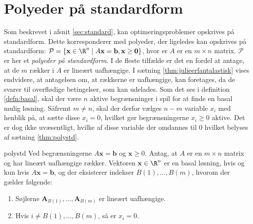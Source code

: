 \section{Polyeder på standardform}
\label{afsnit:fisk}
%
Som beskrevet i afsnit \ref{sec:standard}, kan optimeringsproblemer opskrives på standardform.
Dette korresponderer med polyeder, der ligeledes kan opskrives på standardform: 
$\mathcal{P}=\{ \mathbf{x} \in \R^n  \mid  A\mathbf{x}=\mathbf{b}, \mathbf{x} \geq \mathbf{0} \}$, hvor er $A$ er en $m \times n$ matrix.
$\mathcal{P}$ er her et \textit{polyeder på standardform}.
I de fleste tilfælde er det en fordel at antage, at de $m$ rækker i $A$ er lineært uafhængige.
I sætning \ref{thm:julieerfantalastisk} vises endvidere, at antagelsen om, at rækkerne er uafhængige, kan foretages, da de svarer til overflødige betingelser, som kan udelades.
Som det ses i definition \ref{defn:basal}, skal der være $n$ aktive begrænsninger i spil for at finde en basal mulig løsning.
Såfremt $m \neq n$, skal der derfor vælges $n-m$ variable $x_i$ med henblik på, at sætte disse $x_i=0$, hvilket gør begrænsningerne $x_i \geq 0$ aktive.
Det er dog ikke uvæsentligt, hvilke af disse variable der omdannes til $0$ hvilket belyses af sætning \ref{thm:polystd}.
%
\begin{thm}{}{polystd}
Ved begrænsningerne $A\mathbf{x}=\mathbf{b}$ og $\mathbf{x}\geq 0$.
Antag, at $A$ er en $m \times n$ matrix og har lineært uafhængige rækker.
Vektoren $\mathbf{x} \in \R^n$ er en basal løsning, hvis og kun hvis $A\mathbf{x}=\mathbf{b}$, og der eksisterer indekser $B(1),\ldots,B(m)$, hvorom der gælder følgende:
\begin{enumerate}[label=(\alph*)]
\item Søjlerne $\mathbf{A}_{B(1)},\ldots,\mathbf{A}_{B(m)}$ er lineært uafhængige.
\item Hvis $i \neq B(1),\ldots, B(m)$, så er $x_i=0$.
\end{enumerate}
\end{thm}
